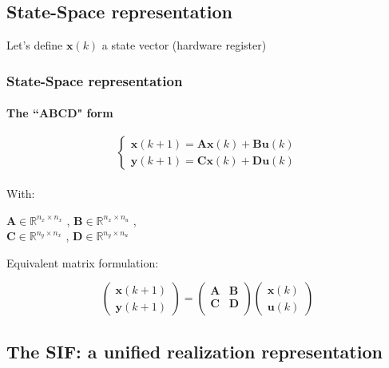 \subsection{State-Space representation}
\begin{frame}
	Let's define $\boldsymbol{x}(k)$ a state vector (hardware register)
	\frametitle{State-Space representation}
	\framesubtitle{The ``ABCD" form}
	\begin{equation} \label{abcddef}
		\begin{cases}
			\boldsymbol{x}(k+1)= \boldsymbol{Ax}(k) + \boldsymbol{Bu}(k) \\
			\boldsymbol{y}(k+1)= \boldsymbol{Cx}(k) + \boldsymbol{Du}(k)
		\end{cases}
	\end{equation}
	\\
	With: \\
		\begin{center}
	$\boldsymbol{A} \in \mathbb{R}^{n_x \times n_x}$ ,
	$\boldsymbol{B} \in \mathbb{R}^{n_x \times n_u}$ , \\
	$\boldsymbol{C} \in \mathbb{R}^{n_y \times n_x}$ ,
	$\boldsymbol{D} \in \mathbb{R}^{n_y \times n_u}$
		\end{center}

	Equivalent matrix formulation:
	
	\begin{equation} \label{abcdef}
		\begin{pmatrix}
			\boldsymbol{x} (k+1)  \\
			\boldsymbol{y} (k+1) 
		\end{pmatrix}
		=
		\begin{pmatrix}
			\boldsymbol{A} & \boldsymbol{B} \\
			\boldsymbol{C} & \boldsymbol{D} \\
		\end{pmatrix}
		\begin{pmatrix}
			\boldsymbol{x} (k)  \\
			\boldsymbol{u} (k) 
		\end{pmatrix}
	\end{equation}

\end{frame}





\subsection{The SIF: a unified realization representation }

